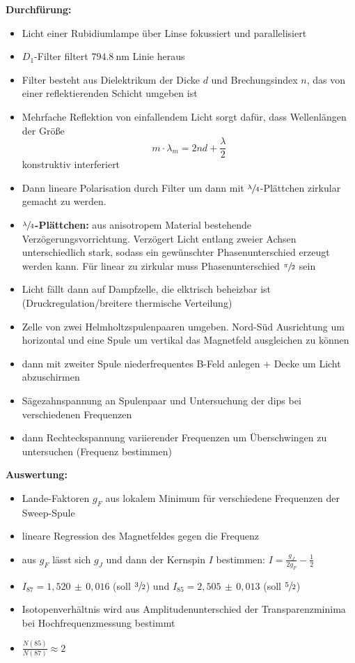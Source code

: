 \textbf{Durchfürung:}
\begin{itemize}
    \item Licht einer Rubidiumlampe über Linse fokussiert und parallelisiert
    \item $D_1$-Filter filtert $\SI{794,8}{\nano\meter}$ Linie heraus
    \item Filter besteht aus Dielektrikum der Dicke $d$ und Brechungsindex $n$, das von einer reflektierenden Schicht umgeben ist
    \item Mehrfache Reflektion von einfallendem Licht sorgt dafür, dass Wellenlängen der Größe
        \begin{equation}
            m\cdot \lambda_m = 2nd+\frac{\lambda}{2}
        \end{equation}
        konstruktiv interferiert
    \item Dann lineare Polarisation durch Filter um dann mit $\sfrac{\lambda}{4}$-Plättchen zirkular gemacht zu werden.
    \item \textbf{$\sfrac{\lambda}{4}$-Plättchen:} aus anisotropem Material bestehende Verzögerungsvorrichtung. Verzögert Licht entlang zweier Achsen unterschiedlich stark, sodass ein gewünschter Phasenunterschied erzeugt werden kann. Für linear zu zirkular muss Phasenunterschied $\sfrac{\pi}{2}$ sein
    \item Licht fällt dann auf Dampfzelle, die elktrisch beheizbar ist (Druckregulation/breitere thermische Verteilung)
    \item Zelle von zwei Helmholtzspulenpaaren umgeben. Nord-Süd Ausrichtung um horizontal und eine Spule um vertikal das Magnetfeld ausgleichen zu können
    \item dann mit zweiter Spule niederfrequentes B-Feld anlegen + Decke um Licht abzuschirmen
    \item Sägezahnspannung an Spulenpaar und Untersuchung der dips bei verschiedenen Frequenzen
    \item dann Rechteckspannung variierender Frequenzen um Überschwingen zu untersuchen (Frequenz bestimmen)
\end{itemize}

\textbf{Auswertung:}
\begin{itemize}
    \item Lande-Faktoren $g_F$ aus lokalem Minimum für verschiedene Frequenzen der Sweep-Spule
    \item lineare Regression des Magnetfeldes gegen die Frequenz
    \item aus $g_F$ lässt sich $g_J$ und dann der Kernspin $I$ bestimmen: $I=\frac{g_J}{2g_F}-\frac{1}{2}$
    \item $I_{87} = 1,520\,\pm\,0,016$ (soll $\sfrac{3}{2}$) und $I_{85} = 2,505\,\pm\,0,013$ (soll $\sfrac{5}{2}$)
    \item Isotopenverhältnis wird aus Amplitudenunterschied der Transparenzminima bei Hochfrequenzmessung bestimmt
    \item $\frac{N(85)}{N(87)}\approx 2$
\end{itemize}
